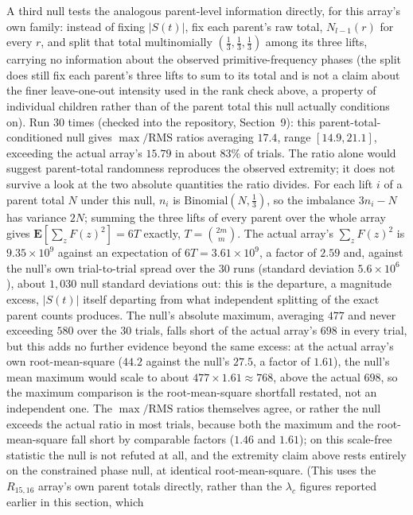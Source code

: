 \documentclass[11pt]{amsart}
\theoremstyle{plain}
\theoremstyle{definition}
\theoremstyle{remark}
\begin{document}
A third null tests the analogous parent-level information directly, for this array's own family:
instead of fixing $|S(t)|$, fix each parent's raw total,
$N_{l-1}(r)$ for every $r$, and split that total multinomially
$(\tfrac13,\tfrac13,\tfrac13)$ among its three lifts, carrying no information about the observed
primitive-frequency phases (the split does still fix each parent's three lifts to sum to its total
and is not a claim about
the finer leave-one-out intensity used in the rank check above, a property of individual
children rather than of the parent total this null actually conditions on). Run $30$ times (checked into the
repository, Section~9): this
parent-total-conditioned null gives $\max/\mathrm{RMS}$ ratios averaging $17.4$, range $[14.9,21.1]$,
exceeding the actual array's $15.79$ in about $83\%$ of trials. The ratio alone would suggest
parent-total randomness reproduces the observed extremity; it does not survive a look at the two
absolute quantities the ratio divides. For each lift $i$
of a parent total $N$ under this null, $n_i$ is $\mathrm{Binomial}(N,\tfrac13)$, so the imbalance
$3n_i-N$ has variance $2N$; summing the three lifts of every parent over the whole array gives
$\mathbf{E}[\sum_z F(z)^2]=6T$ exactly, $T=\binom{2m}{m}$. The actual array's $\sum_z F(z)^2$ is
$9.35\times10^9$ against an expectation of $6T=3.61\times10^9$, a factor of $2.59$ and, against the
null's own trial-to-trial spread over the $30$ runs (standard deviation $5.6\times10^6$), about
$1{,}030$ null standard deviations out: this is the departure, a magnitude excess, $|S(t)|$
itself departing from what independent splitting of the exact parent counts produces. The null's
absolute maximum, averaging $477$ and never
exceeding $580$ over the $30$ trials, falls short of the actual array's $698$ in every trial, but this
adds no further evidence beyond the same excess: at the actual array's own root-mean-square ($44.2$
against the null's $27.5$, a factor of $1.61$), the null's mean maximum would scale to about
$477\times1.61\approx768$, above the actual $698$, so the maximum comparison is the root-mean-square
shortfall restated, not an independent one. The
$\max/\mathrm{RMS}$ ratios themselves agree, or rather the null exceeds the actual ratio in most
trials, because both the maximum and the root-mean-square fall short by comparable factors
($1.46$ and $1.61$); on this scale-free statistic the null is not refuted at all, and the extremity
claim above rests entirely on the constrained phase null, at identical root-mean-square.
(This uses the $R_{15,16}$ array's own
parent totals directly, rather than the $\lambda_c$ figures reported earlier in this section, which
\end{document}
